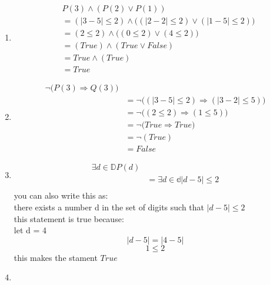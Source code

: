 \documentclass[11pt,twoside]{amsart}
\begin{document}
\begin{enumerate}[1)]
	\item
    \begin{align*}
          &P(3) \land (P(2) \lor P(1)) \\
          &= ( |3-5| \leq 2) \land \Big((|2-2| \leq 2) \lor (|1-5| \leq 2) \Big) \\
          &= (2 \leq 2) \land \Big( ( 0 \leq 2) \lor (4 \leq 2) \Big) \\
          &=(True) \land ( True \lor False) \\
          &=True \land (True) \\
          &=True
    \end{align*}
	\item
    \begin{align*}
      \neg \big( P(3) \Rightarrow Q(3) \big)\\
      &= \neg \big( (|3-5| \leq 2) \Rightarrow (|3-2| \leq 5) \big)\\
      &= \neg \big( (2 \leq 2) \Rightarrow (1 \leq 5) \big)\\
      &= \neg \big( True \Rightarrow True \big)\\
      &= \neg (True) \\
      &= False
    \end{align*}
	\item 
    \begin{align*}
      \exists d \in \mathbb{D} P(d)\\
      &= \exists d \in \mathbb{d} |d-5| \leq 2 \\
    \end{align*}
    you can also write this as: \\
    there exists a number d in the set of digits such that $|d-5| \leq 2$\\
    this statement is true because: \\
   let d = 4
    $$|d-5| = |4-5|$$
    $$1 \leq 2$$
   this makes the stament $True$
	\item           


\end{enumerate}
\end{document}
